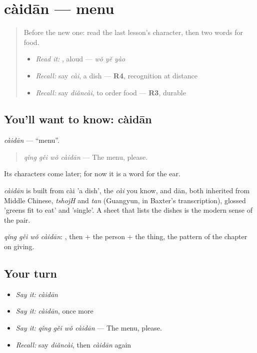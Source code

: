 \section[càidān]{càidān — menu}

\label{lesson:ZH-C92-caidan}



\begin{quote}
Before the new one: read the last lesson's character, then two words for food.

\begin{itemize}
\raggedright
  \item \emph{Read it:} , aloud — \emph{wǒ yě yào}
  \item \emph{Recall:} say \emph{cài}, a dish — \textbf{R4}, recognition at distance
  \item \emph{Recall:} say \emph{diǎncài}, to order food — \textbf{R3}, durable
\end{itemize}
\end{quote}

\subsection*{You'll want to know: càidān}
\emph{càidān} — \textquotedblleft{}menu\textquotedblright{}.

\begin{quote}
\emph{qǐng gěi wǒ càidān} — The menu, please.
\end{quote}

Its characters come later; for now it is a word for the ear.

\begin{cousinweb}
\emph{càidān} is built from cài 'a dish', the \emph{cài} you know, and dān, both inherited from Middle Chinese, \emph{tshojH} and \emph{tan} (Guangyun, in Baxter's transcription), glossed 'greens fit to eat' and 'single'. A sheet that lists the dishes is the modern sense of the pair.
\end{cousinweb}

\begin{grammarlens}[title={What you've built}]
\emph{qǐng gěi wǒ càidān}: , then  + the person + the thing, the pattern of the chapter on giving.
\end{grammarlens}

\subsection*{Your turn}
\begin{itemize}
\raggedright
  \item \emph{Say it:} \emph{càidān}
  \item \emph{Say it:} \emph{càidān}, once more
  \item \emph{Say it:} \emph{qǐng gěi wǒ càidān} — The menu, please.
  \item \emph{Recall:} say \emph{diǎncài}, then \emph{càidān} again
\end{itemize}

